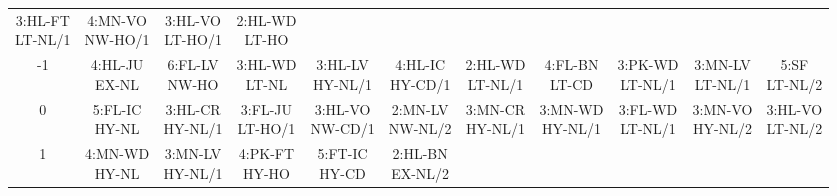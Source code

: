 \begin{table}[htbp]
{\begin{minipage}{0.9\textwidth}
\begin{tabular}{c|cccccccccc}
    \parbox{\cellwidth}{3:HL-FT\\LT-NL/1} & 
    \parbox{\cellwidth}{4:MN-VO\\NW-HO/1} & 
    \parbox{\cellwidth}{3:HL-VO\\LT-HO/1} & 
    \parbox{\cellwidth}{2:HL-WD\\LT-HO}\\[\extralinespace]
    -1 & 
    \parbox{\cellwidth}{4:HL-JU\\EX-NL} & 
    \parbox{\cellwidth}{6:FL-LV\\NW-HO} & 
    \parbox{\cellwidth}{3:HL-WD\\LT-NL} & 
    \parbox{\cellwidth}{3:HL-LV\\HY-NL/1} & 
    \parbox{\cellwidth}{4:HL-IC\\HY-CD/1} & 
    \parbox{\cellwidth}{2:HL-WD\\LT-NL/1} & 
    \parbox{\cellwidth}{4:FL-BN\\LT-CD} & 
    \parbox{\cellwidth}{3:PK-WD\\LT-NL/1} & 
    \parbox{\cellwidth}{3:MN-LV\\LT-NL/1} & 
    \parbox{\cellwidth}{5:SF\\LT-NL/2}\\[\extralinespace]
    0 & 
    \parbox{\cellwidth}{5:FL-IC\\HY-NL} & 
    \parbox{\cellwidth}{3:HL-CR\\HY-NL/1} & 
    \parbox{\cellwidth}{3:FL-JU\\LT-HO/1} & 
    \parbox{\cellwidth}{3:HL-VO\\NW-CD/1} & 
    \parbox{\cellwidth}{2:MN-LV\\NW-NL/2} & 
    \parbox{\cellwidth}{3:MN-CR\\HY-NL/1} & 
    \parbox{\cellwidth}{3:MN-WD\\HY-NL/1} & 
    \parbox{\cellwidth}{3:FL-WD\\LT-NL/1} & 
    \parbox{\cellwidth}{3:MN-VO\\HY-NL/2} & 
    \parbox{\cellwidth}{3:HL-VO\\LT-NL/2}\\[\extralinespace]
    1 & 
    \parbox{\cellwidth}{4:MN-WD\\HY-NL} & 
    \parbox{\cellwidth}{3:MN-LV\\HY-NL/1} & 
    \parbox{\cellwidth}{4:PK-FT\\HY-HO} & 
    \parbox{\cellwidth}{5:FT-IC\\HY-CD} & 
    \parbox{\cellwidth}{2:HL-BN\\EX-NL/2} & 

\end{tabular}
\end{minipage}}
\end{table}
